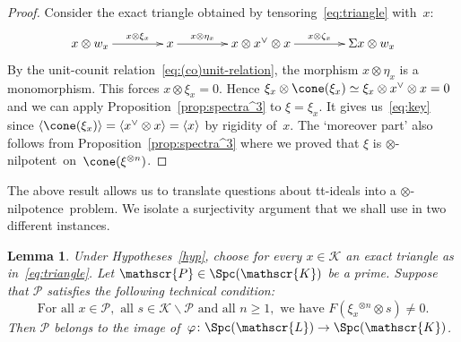 \documentclass{amsart}
\numberwithin{equation}{section}
\newtheorem{Lem}[equation]{Lemma}
\theoremstyle{remark}
\begin{document}
\begin{proof}
Consider the exact triangle obtained by tensoring~\eqref{eq:triangle} with~$x$:
\[
\xymatrix@C=4em{
x\otimes w_x \ar[r]^-{x\otimes \xi_x}
& x \ar[r]^-{x\otimes \eta_x}
& x\otimes x^\vee\otimes x \ar[r]^-{x\otimes \zeta_x}
& \Sigma x\otimes w_x
}
\]
By the unit-counit relation~\eqref{eq:(co)unit-relation}, the morphism $x\otimes \eta_x$ is a monomorphism. This forces $x\otimes \xi_x=0$. Hence $\xi_x\otimes \cone(\xi_x)\simeq \xi_x\otimes x^\vee\otimes x=0$ and we can apply Proposition~\ref{prop:spectra^3} to $\xi=\xi_x$. It gives us~\eqref{eq:key} since ${\langle {\cone(\xi_x)}\rangle}={\langle {x^\vee\otimes x}\rangle}={\langle {x}\rangle}$ by rigidity of~$x$. The `moreover part' also follows from Proposition~\ref{prop:spectra^3} where we proved that $\xi$ is {$\otimes$-nilpotent}\ on~$\cone(\xi{^{\otimes {n}}})$.
\end{proof}

The above result allows us to translate questions about tt-ideals into a {$\otimes$-nilpotence}\ problem. We isolate a surjectivity argument that we shall use in two different instances.
\begin{Lem}
\label{lem:key}Under Hypotheses~\ref{hyp}, choose for every $x\in{\mathscr{{K}}}$ an exact triangle as in~\eqref{eq:triangle}. Let ${{\mathscr{{P}}}}\in{\Spc({\mathscr{K}})}$ be a prime. Suppose that ${{\mathscr{{P}}}}$ satisfies the following technical condition:
\begin{equation}
\label{eq:N}\textrm{For all }x\in {{\mathscr{{P}}}},\textrm{ all }s\in{\mathscr{{K}}}{\!\smallsetminus\!}{{\mathscr{{P}}}}\textrm{ and all }n\ge1,\textrm{ we have }F(\xi_x{^{\otimes {n}}}\otimes s)\neq0.
\end{equation}
Then ${{\mathscr{{P}}}}$ belongs to the image of~$\varphi\colon{\Spc({\mathscr{L}})}\to {\Spc({\mathscr{K}})}$.
\end{Lem}
\end{document}
